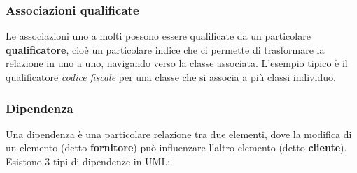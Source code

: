 \documentclass[a4paper,11pt]{article}
\begin{document}
\subsubsection{Associazioni qualificate}
Le associazioni uno a molti possono essere qualificate da un particolare \textbf{qualificatore}, cioè un particolare indice che ci permette di trasformare la relazione in uno a uno, navigando verso la classe associata.
L'esempio tipico è il qualificatore \textit{codice fiscale} per una classe che si associa a più classi individuo.  

\subsubsection{Dipendenza}
Una dipendenza è una particolare relazione tra due elementi, dove la modifica di un elemento (detto \textbf{fornitore}) può influenzare l'altro elemento (detto \textbf{cliente}).
Esistono 3 tipi di dipendenze in UML:
\end{document}
